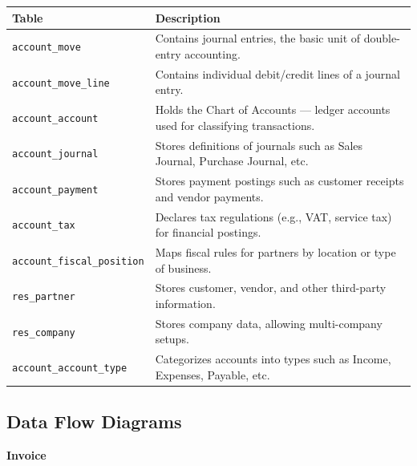 \documentclass[11pt,a4paper]{article}
\begin{document}
\begin{tabular}{|l|p{10cm}|}
    \hline
    \textbf{Table} & \textbf{Description} \\
    \hline
    \texttt{account\_move} & Contains journal entries, the basic unit of double-entry accounting. \\
    \hline
    \texttt{account\_move\_line} & Contains individual debit/credit lines of a journal entry. \\
    \hline
    \texttt{account\_account} & Holds the Chart of Accounts — ledger accounts used for classifying transactions. \\
    \hline
    \texttt{account\_journal} & Stores definitions of journals such as Sales Journal, Purchase Journal, etc. \\
    \hline
    \texttt{account\_payment} & Stores payment postings such as customer receipts and vendor payments. \\
    \hline
    \texttt{account\_tax} & Declares tax regulations (e.g., VAT, service tax) for financial postings. \\
    \hline
    \texttt{account\_fiscal\_position} & Maps fiscal rules for partners by location or type of business. \\
    \hline
    \texttt{res\_partner} & Stores customer, vendor, and other third-party information. \\
    \hline
    \texttt{res\_company} & Stores company data, allowing multi-company setups. \\
    \hline
    \texttt{account\_account\_type} & Categorizes accounts into types such as Income, Expenses, Payable, etc. \\
    \hline
\end{tabular}

\newpage
\subsection{Data Flow Diagrams}
\noindent\textbf{Invoice}
\end{document}
